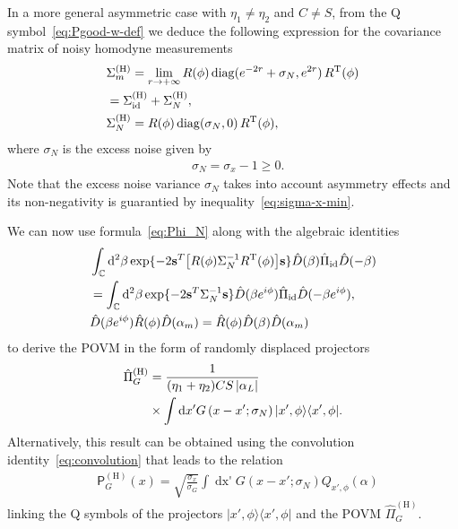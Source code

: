 \documentclass[%
reprint,
superscriptaddress,
 amsmath,amssymb,amsfonts,
 aps,
 pra,
 longbibliography
]{revtex4-2}
\newcommand{\ket}[1]{\ensuremath{|{#1}\rangle}}
\newcommand{\bra}[1]{\ensuremath{\langle{#1}|}}
\newcommand{\tcnj}[1]{{#1}^{\mathrm{T}}}
\newcommand{\vc}[1]{\mathbf{#1}}
\newcommand{\ind}[1]{\mathrm{#1}}
\newcommand{\prob}{\mathsf{P}}
\newcommand{\dd}{\mathrm{d}}
\begin{document}
In a more general asymmetric case with $\eta_1\ne \eta_2$
and $C\ne S$, from the Q symbol~\eqref{eq:Pgood-w-def}
we deduce the following expression for the covariance matrix of
noisy homodyne measurements
\begin{align}
  &
    \label{eq:Sigma-H-m}
    \Sigma_{m}^{(\ind{H})}= \lim_{r\to+\infty}R(\phi)\,\ind{diag}(e^{-2r}+\sigma_N,e^{2r})\,\tcnj{R}(\phi)
    \notag
  \\
  &
    =\Sigma_{\ind{id}}^{(\ind{H})}+\Sigma_{N}^{(\ind{H})},
  \\
  &
    \label{eq:Sigma-N-H}
    \Sigma_{N}^{(\ind{H})}=R(\phi)\,\ind{diag}(\sigma_N,0)\,\tcnj{R}(\phi),
\end{align}
where $\sigma_N$ is the excess noise given by
\begin{align}
  &
  \label{eq:sgm_N}
     \sigma_N=\sigma_x-1\ge 0.
\end{align}
Note that the excess noise variance $\sigma_N$ takes into account asymmetry effects
and its non-negativity is guarantied by inequality~\eqref{eq:sigma-x-min}.

We can now use formula~\eqref{eq:Phi_N}
along with the algebraic identities
\begin{align}
  \label{eq:phi_N-rel1}
  &
    \int_{\mathbb{C}}\dd^2\beta
    \exp\{-2 \vc{s}^T\bigl[R(\phi)\Sigma_N^{-1}\tcnj{R}(\phi)\bigr]
    \vc{s}\}
    \hat{D}(\beta)\hat{\Pi}_{\ind{id}}\hat{D}(-\beta)
    \notag
  \\
  &
    =\int_{\mathbb{C}}\dd^2\beta
    \exp\{-2 \vc{s}^T\Sigma_N^{-1}\vc{s}\}
    \hat{D}(\beta e^{i\phi})\hat{\Pi}_{\ind{id}}\hat{D}(-\beta e^{i\phi}),
  \\
  &
    \label{eq:phi_N-rel2}
    \hat{D}(\beta e^{i\phi})\hat{R}(\phi)\hat{D}(\alpha_m)=
    \hat{R}(\phi)\hat{D}(\beta)\hat{D}(\alpha_m)
\end{align}
to derive the POVM in the form of randomly displaced
projectors
\begin{align}
\label{eq:homodyne-povm}    
  \hat{\Pi}_G^{(\ind{H})}
  &
               =\frac{1}{(\eta_1+\eta_2)CS\left|\alpha_L\right|}
    \notag
  \\
  &
    \times
    \int \dd x' G\left(x-x'; \sigma_N\right) \ket{x',\phi}\bra{x',\phi}.
\end{align}
Alternatively, this result can be obtained
using the convolution identity~\eqref{eq:convolution}
that leads to the relation
\begin{align}
  &
  \label{eq:theform}
  \prob_G^{(\ind{H})}(x)=\sqrt{\frac{\sigma_x}{\sigma_G}} \int \mathop{\dd x'} G(x-x';\sigma_N) Q_{x',\phi}(\alpha)  
\end{align}
linking the Q symbols of
the projectors $\ket{x',\phi}\bra{x',\phi}$
and the POVM $\hat{\Pi}_G^{(\ind{H})}$.
\end{document}

